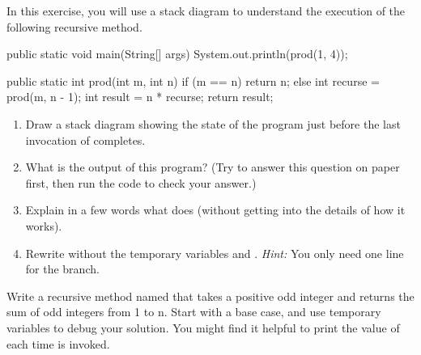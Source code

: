 \begin{exercise}  %

In this exercise, you will use a stack diagram to understand the execution of the following recursive method.

\begin{code}
public static void main(String[] args) {
    System.out.println(prod(1, 4));
}

public static int prod(int m, int n) {
    if (m == n) {
        return n;
    } else {
        int recurse = prod(m, n - 1);
        int result = n * recurse;
        return result;
    }
}
\end{code}

\begin{enumerate}

\item Draw a stack diagram showing the state of the program just before the last invocation of  completes.

\item What is the output of this program?
(Try to answer this question on paper first, then run the code to check your answer.)

\item Explain in a few words what  does (without getting into the details of how it works).

\item Rewrite  without the temporary variables  and .
{\it Hint:} You only need one line for the  branch.

\end{enumerate}

\end{exercise}


\begin{exercise}  %

Write a recursive method named  that takes a positive odd integer  and returns the sum of odd integers from 1 to n.
Start with a base case, and use temporary variables to debug your solution.
You might find it helpful to print the value of  each time  is invoked.

\end{exercise}


